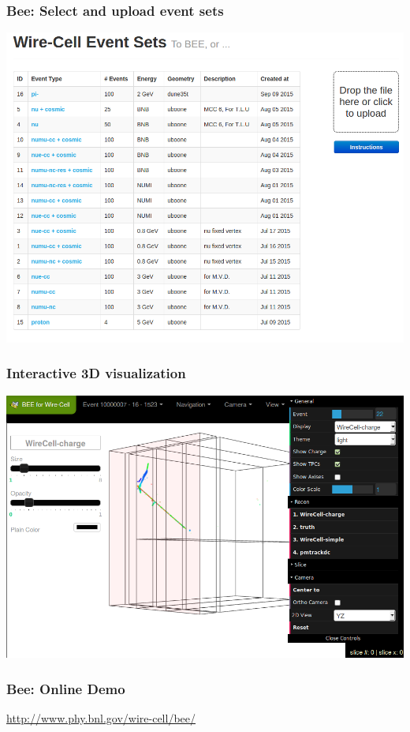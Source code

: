 \documentclass[xcolor=dvipsnames]{beamer}
\begin{document}
\begin{frame}
  \frametitle{Bee: Select and upload event sets}
  \begin{center}
    \includegraphics[height=0.8\textheight]{bee-event-sets-page.png}    
  \end{center}
\end{frame}
\begin{frame}
  \frametitle{Interactive 3D visualization}
  \begin{center}
    \includegraphics[height=0.8\textheight]{bee-full-gui.png}    
  \end{center}
\end{frame}

\begin{frame}
  \frametitle{Bee: Online Demo}
  \begin{center}
    \url{http://www.phy.bnl.gov/wire-cell/bee/}
  \end{center}
\end{frame}
\end{document}
